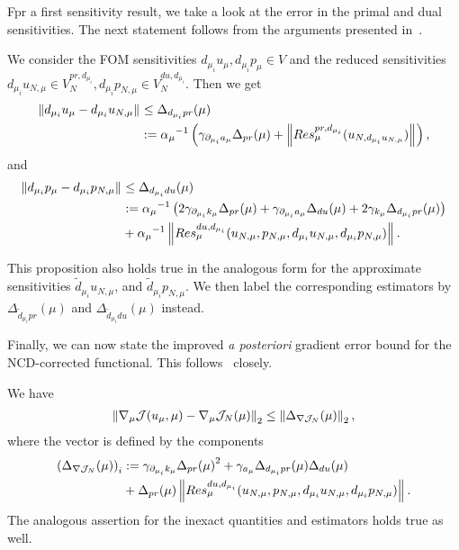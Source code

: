 Fpr a first sensitivity result, we take a look at the error in the primal and dual sensitivities.
The next statement follows from the arguments presented in~\cite[Proposition 3.12, and Proposition 3.13]{Keil2021}.
\begin{proposition}\label{PrDualSensErrProp}
    We consider the FOM sensitivities $d_{\mu_i} u_\mu, d_{\mu_i} p_\mu \in V$ and the reduced sensitivities $d_{\mu_i} u_{N, \mu} \in V_N^{pr, d_{\mu_i}}, d_{\mu_i} p_{N, \mu} \in V_N^{du, d_{\mu_i}}$. Then we get
    \begin{align*}
        \norm{d_{\mu_i} u_\mu - d_{\mu_i} u_{N, \mu}} &\leq \Delta_{d_{\mu_i} pr}(\mu) \\
        &:= {\alpha_\mu}^{-1} \left( \gamma_{\partial_{\mu_i} a_\mu} \Delta_{pr}(\mu) + \norm{Res_\mu^{pr, d_{\mu_i}}(u_{N, d_{\mu_i} u_{N, \mu}})} \right),
    \end{align*}
    and
    \begin{align*}
        \norm{d_{\mu_i} p_\mu - d_{\mu_i} p_{N, \mu}} &\leq \Delta_{d_{\mu_i} du}(\mu) \\
        &:= {\alpha_\mu}^{-1} \left( 2 \gamma_{\partial_{\mu_i} k_\mu} \Delta_{pr}(\mu) + \gamma_{\partial_{\mu_i} a_\mu} \Delta_{du}(\mu) + 2 \gamma_{k_\mu} \Delta_{d_{\mu_i} pr}(\mu) \right) \\
        &+ {\alpha_\mu}^{-1} \norm{Res_\mu^{du, d_{\mu_i}}(u_{N, \mu}, p_{N, \mu}, d_{\mu_i} u_{N, \mu}, d_{\mu_i} p_{N, \mu})}.
    \end{align*}
\end{proposition}
This proposition also holds true in the analogous form for the approximate sensitivities $\tilde{d}_{\mu_i} u_{N, \mu}$, and $\tilde{d}_{\mu_i} p_{N, \mu}$.
We then label the corresponding estimators by $\Delta_{\tilde{d}_{\mu_i} pr}(\mu)$ and $\Delta_{\tilde{d}_{\mu_i} du}(\mu)$ instead.

Finally, we can now state the improved \textit{a posteriori} gradient error bound for the NCD-corrected functional.
This follows~\cite[Proposition 3.14]{Keil2021} closely.
\begin{proposition}\label{GoodNCDGradientProp}
    We have
    \begin{align*}
        \norm[2]{\nabla_\mu \mathcal{J}(u_\mu, \mu) - \nabla_\mu \mathcal{J}_N(\mu)} \leq \norm[2]{\Delta_{\nabla \mathcal{J}_N}(\mu)},
    \end{align*}
    where the vector is defined by the components
    \begin{align*}
        {\left( \Delta_{\nabla \mathcal{J}_N}(\mu) \right)}_i &:= \gamma_{\partial_{\mu_i} k_\mu} {\Delta_{pr}(\mu)}^2 + \gamma_{a_\mu} \Delta_{d_{\mu_i} pr}(\mu) \Delta_{du}(\mu) \\
        &+ \Delta_{pr}(\mu) \norm{Res_\mu^{du, d_{\mu_i}}(u_{N, \mu}, p_{N, \mu}, d_{\mu_i} u_{N, \mu}, d_{\mu_i} p_{N, \mu})}.
    \end{align*}
    The analogous assertion for the inexact quantities and estimators holds true as well.
\end{proposition}

